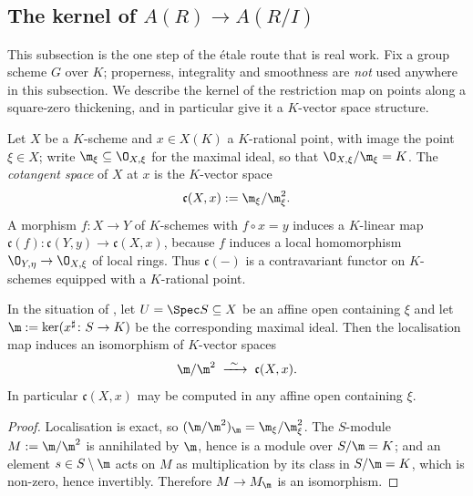 \subsection{The kernel of $A(R)\to A(R/I)$}\label{sec:av-etale-kernel}

This subsection is the one step of the \'etale route that is real work.  Fix a
group scheme $G$ over $K$; properness, integrality and smoothness are \emph{not}
used anywhere in this subsection.  We describe the kernel of the restriction map
on points along a square-zero thickening, and in particular give it a
$K$-vector space structure.

\begin{definition}\label{def:av-cotangent}
Let $X$ be a $K$-scheme and $x\in X(K)$ a $K$-rational point, with image the
point $\xi\in X$; write $\m_\xi\subseteq\O_{X,\xi}$ for the maximal ideal, so
that $\O_{X,\xi}/\m_\xi=K$.  The \emph{cotangent space} of $X$ at $x$ is the
$K$-vector space
\[
  \mathfrak c(X,x):=\m_\xi/\m_\xi^2 .
\]
A morphism $f\colon X\to Y$ of $K$-schemes with $f\circ x=y$ induces a
$K$-linear map $\mathfrak c(f)\colon\mathfrak c(Y,y)\to\mathfrak c(X,x)$,
because $f$ induces a local homomorphism $\O_{Y,\eta}\to\O_{X,\xi}$ of local
rings.  Thus $\mathfrak c(-)$ is a contravariant functor on $K$-schemes
equipped with a $K$-rational point.
\end{definition}

\begin{lemma}
\label{lem:av-cotangent-affine}
In the situation of , let $U=\Spec S\subseteq X$ be an
affine open containing $\xi$ and let $\m:=\ker(x^\sharp\colon S\to K)$ be the
corresponding maximal ideal.  Then the localisation map induces an isomorphism
of $K$-vector spaces
\[
  \m/\m^2\;\xrightarrow{\ \sim\ }\;\mathfrak c(X,x).
\]
In particular $\mathfrak c(X,x)$ may be computed in any affine open containing
$\xi$.
\end{lemma}
\begin{proof}
Localisation is exact, so $(\m/\m^2)_\m=\m_\xi/\m_\xi^2$.  The $S$-module
$M:=\m/\m^2$ is annihilated by $\m$, hence is a module over $S/\m=K$; and an
element $s\in S\setminus\m$ acts on $M$ as multiplication by its class in
$S/\m=K$, which is non-zero, hence invertibly.  Therefore $M\to M_\m$ is an
isomorphism.
\end{proof}


